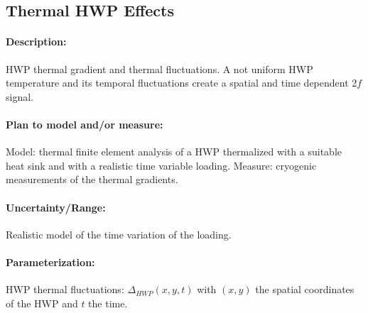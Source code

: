\subsection{Thermal HWP Effects}

\paragraph{Description:}
HWP thermal gradient and thermal fluctuations. A not uniform HWP temperature and its temporal fluctuations create a spatial and time dependent 2$f$ signal.

\paragraph{Plan to model and/or measure:}
Model: thermal finite element analysis of a HWP thermalized with a suitable heat sink and with a realistic time variable loading.
Measure: cryogenic measurements of the thermal gradients.


\paragraph{Uncertainty/Range:}
Realistic model of the time variation of the loading.


\paragraph{Parameterization:}
HWP thermal fluctuations: $\Delta_{HWP}(x,y,t)$ with $(x,y)$ the spatial coordinates of the HWP and $t$ the time.
